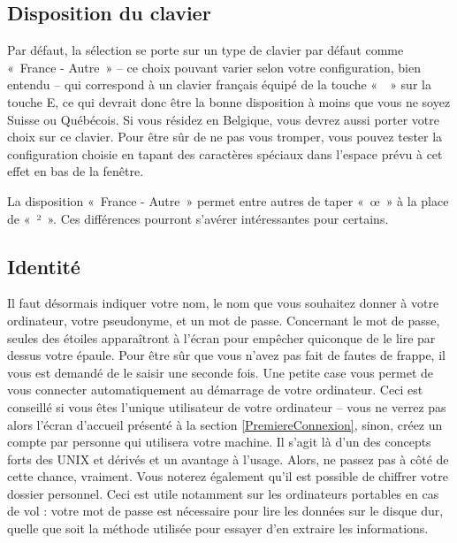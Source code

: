 \subsection{Disposition du clavier}
Par défaut, la sélection se porte sur un type de clavier par défaut comme «~France - Autre~» -- ce choix pouvant varier selon votre configuration, bien entendu -- qui correspond à un clavier français équipé de la touche «~\texteuro{}~» sur la touche E, ce qui devrait donc être la bonne disposition à moins que vous ne soyez Suisse ou Québécois. Si vous résidez en Belgique, vous devrez aussi porter votre choix sur ce clavier. Pour être sûr de ne pas vous tromper, vous pouvez tester la configuration choisie en tapant des caractères spéciaux dans l'espace prévu à cet effet en bas de la fenêtre.
\begin{nota}
La disposition «~France - Autre~» permet entre autres de taper «~œ~» à la place de «~²~». Ces différences pourront s'avérer intéressantes pour certains.
\end{nota}
\subsection{Identité}
\label{InstallIdentite}
Il faut désormais indiquer votre nom, le nom que vous souhaitez donner à votre ordinateur, votre pseudonyme, et un mot de passe. Concernant le mot de passe, seules des étoiles apparaîtront à l'écran pour empêcher quiconque de le lire par dessus votre épaule. Pour être sûr que vous n'avez pas fait de fautes de frappe, il vous est demandé de le saisir une seconde fois. Une petite case vous permet de vous connecter automatiquement au démarrage de votre ordinateur. Ceci est conseillé si vous êtes l'unique utilisateur de votre ordinateur -- vous ne verrez pas alors l'écran d'accueil présenté à la section \ref{PremiereConnexion}, sinon, créez un compte par personne qui utilisera votre machine. Il s'agit là d'un des concepts forts des UNIX et dérivés et un avantage à l'usage. Alors, ne passez pas à côté de cette chance, vraiment. Vous noterez également qu'il est possible de chiffrer votre dossier personnel. Ceci est utile notamment sur les ordinateurs portables en cas de vol : votre mot de passe est nécessaire pour lire les données sur le disque dur, quelle que soit la méthode utilisée pour essayer d'en extraire les informations.\par
{}
